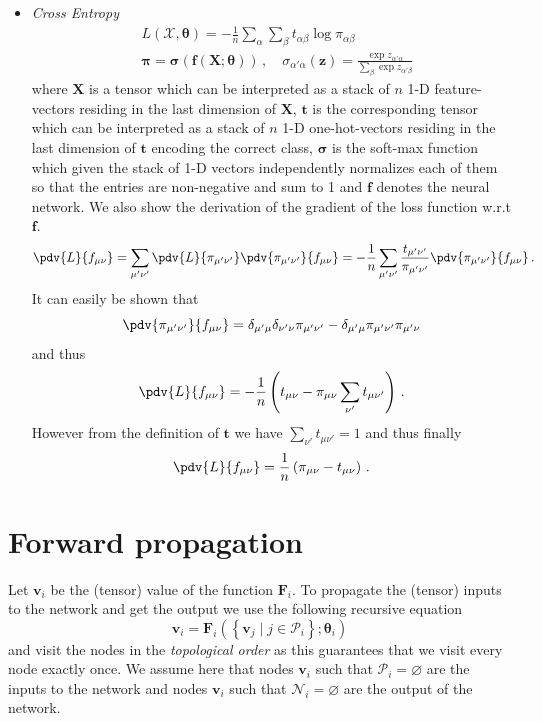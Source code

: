 \documentclass[a5paper]{article}
\newcommand{\mc}[1]{\mathcal{#1}}
\begin{document}
\begin{itemize}
   \item \emph{Cross Entropy}
   \[
   \begin{split}
      & L(\mc{X}, \bm{\theta}) = -\frac{1}{n}\sum_{\alpha}\sum_{\beta} t_{\alpha\beta} \log \pi_{\alpha\beta}\\
      & \bm{\pi} = \bm{\sigma}\left( \bm{f}(\bm{X};\bm{\theta}) \right)\,,\quad \sigma_{\alpha'\alpha}(\bm{z}) = \frac{\exp z_{\alpha'\alpha}}{\sum_{\beta} \exp z_{\alpha'\beta}}
   \end{split}
   \]
   where \(\bm{X}\) is a tensor which can be interpreted as a stack of \(n\) 1-D feature-vectors
   residing in the last dimension of \(\bm{X}\), \(\bm{t}\) is the corresponding tensor which can be
   interpreted as a stack of \(n\) 1-D one-hot-vectors residing in the last dimension of \(\bm{t}\)
   encoding the correct class, \(\bm{\sigma}\) is the soft-max function which given the stack of 1-D
   vectors independently normalizes each of them so that the entries are non-negative and sum to 1
   and \(\bm{f}\) denotes the neural network. We also show the derivation of the gradient of the
   loss function w.r.t \(\bm{f}\).
   \[
   \pdv{L}{f_{\mu\nu}} = \sum_{\mu'\nu'} \pdv{L}{\pi_{\mu'\nu'}} \pdv{\pi_{\mu'\nu'}}{f_{\mu\nu}} = -\frac{1}{n}\sum_{\mu'\nu'} \frac{t_{\mu'\nu'}}{\pi_{\mu'\nu'}} \pdv{\pi_{\mu'\nu'}}{f_{\mu\nu}}\,.
   \]
   It can easily be shown that
   \[
      \pdv{\pi_{\mu'\nu'}}{f_{\mu\nu}} = \delta_{\mu'\mu} \delta_{\nu'\nu} \pi_{\mu'\nu'} - \delta_{\mu'\mu} \pi_{\mu'\nu'} \pi_{\mu' \nu}
   \]
   and thus
   \[
      \pdv{L}{f_{\mu\nu}} = -\frac{1}{n} \left( t_{\mu\nu} - \pi_{\mu\nu} \sum_{\nu'} t_{\mu\nu'} \right)\,.
   \]
   However from the definition of \(\bm{t}\) we have \(\sum_{\nu'} t_{\mu\nu'} = 1\) and thus
   finally
   \[
      \pdv{L}{f_{\mu\nu}} = \frac{1}{n} \left( \pi_{\mu\nu} - t_{\mu\nu} \right)\,.
   \]


\end{itemize}


\section{Forward propagation}

Let \(\bm{v}_i\) be the (tensor) value of the function \(\bm{F}_i\). To propagate the (tensor)
inputs to the network and get the output we use the following recursive equation
\[
   \bm{v}_i = \bm{F}_i \left( \left\{\bm{v}_j \mid j \in \mathscr{P}_i \right\} ; \bm{\theta}_i \right)
\] 
and visit the nodes in the \emph{topological order} as this guarantees that we visit every node
exactly once. We assume here that nodes \(\bm{v}_i\) such that \(\mathscr{P}_i = \varnothing\) are
the inputs to the network and nodes \(\bm{v}_i\) such that \(\mathscr{N}_i = \varnothing\) are the
output of the network.
\end{document}

